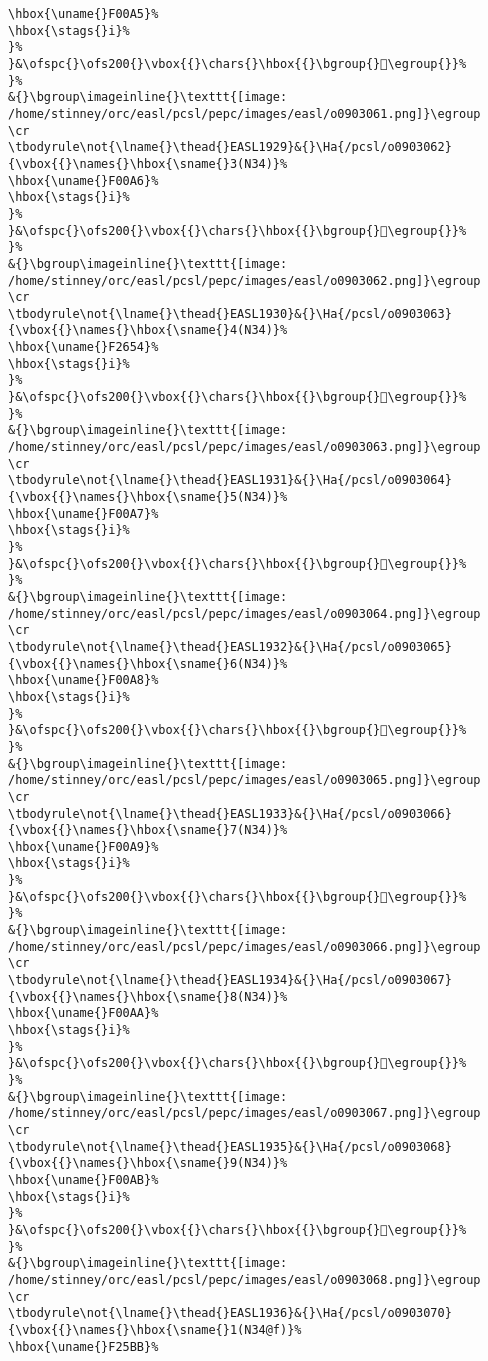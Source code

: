 \begin{verbatim}
\hbox{\uname{}F00A5}%
\hbox{\stags{}i}%
}%
}&\ofspc{}\ofs200{}\vbox{{}\chars{}\hbox{{}\bgroup{}󰂥\egroup{}}%
}%
&{}\bgroup\imageinline{}\texttt{[image: /home/stinney/orc/easl/pcsl/pepc/images/easl/o0903061.png]}\egroup
\cr
\tbodyrule\not{\lname{}\thead{}EASL1929}&{}\Ha{/pcsl/o0903062}{\vbox{{}\names{}\hbox{\sname{}3(N34)}%
\hbox{\uname{}F00A6}%
\hbox{\stags{}i}%
}%
}&\ofspc{}\ofs200{}\vbox{{}\chars{}\hbox{{}\bgroup{}󰂦\egroup{}}%
}%
&{}\bgroup\imageinline{}\texttt{[image: /home/stinney/orc/easl/pcsl/pepc/images/easl/o0903062.png]}\egroup
\cr
\tbodyrule\not{\lname{}\thead{}EASL1930}&{}\Ha{/pcsl/o0903063}{\vbox{{}\names{}\hbox{\sname{}4(N34)}%
\hbox{\uname{}F2654}%
\hbox{\stags{}i}%
}%
}&\ofspc{}\ofs200{}\vbox{{}\chars{}\hbox{{}\bgroup{}󲙔\egroup{}}%
}%
&{}\bgroup\imageinline{}\texttt{[image: /home/stinney/orc/easl/pcsl/pepc/images/easl/o0903063.png]}\egroup
\cr
\tbodyrule\not{\lname{}\thead{}EASL1931}&{}\Ha{/pcsl/o0903064}{\vbox{{}\names{}\hbox{\sname{}5(N34)}%
\hbox{\uname{}F00A7}%
\hbox{\stags{}i}%
}%
}&\ofspc{}\ofs200{}\vbox{{}\chars{}\hbox{{}\bgroup{}󰂧\egroup{}}%
}%
&{}\bgroup\imageinline{}\texttt{[image: /home/stinney/orc/easl/pcsl/pepc/images/easl/o0903064.png]}\egroup
\cr
\tbodyrule\not{\lname{}\thead{}EASL1932}&{}\Ha{/pcsl/o0903065}{\vbox{{}\names{}\hbox{\sname{}6(N34)}%
\hbox{\uname{}F00A8}%
\hbox{\stags{}i}%
}%
}&\ofspc{}\ofs200{}\vbox{{}\chars{}\hbox{{}\bgroup{}󰂨\egroup{}}%
}%
&{}\bgroup\imageinline{}\texttt{[image: /home/stinney/orc/easl/pcsl/pepc/images/easl/o0903065.png]}\egroup
\cr
\tbodyrule\not{\lname{}\thead{}EASL1933}&{}\Ha{/pcsl/o0903066}{\vbox{{}\names{}\hbox{\sname{}7(N34)}%
\hbox{\uname{}F00A9}%
\hbox{\stags{}i}%
}%
}&\ofspc{}\ofs200{}\vbox{{}\chars{}\hbox{{}\bgroup{}󰂩\egroup{}}%
}%
&{}\bgroup\imageinline{}\texttt{[image: /home/stinney/orc/easl/pcsl/pepc/images/easl/o0903066.png]}\egroup
\cr
\tbodyrule\not{\lname{}\thead{}EASL1934}&{}\Ha{/pcsl/o0903067}{\vbox{{}\names{}\hbox{\sname{}8(N34)}%
\hbox{\uname{}F00AA}%
\hbox{\stags{}i}%
}%
}&\ofspc{}\ofs200{}\vbox{{}\chars{}\hbox{{}\bgroup{}󰂪\egroup{}}%
}%
&{}\bgroup\imageinline{}\texttt{[image: /home/stinney/orc/easl/pcsl/pepc/images/easl/o0903067.png]}\egroup
\cr
\tbodyrule\not{\lname{}\thead{}EASL1935}&{}\Ha{/pcsl/o0903068}{\vbox{{}\names{}\hbox{\sname{}9(N34)}%
\hbox{\uname{}F00AB}%
\hbox{\stags{}i}%
}%
}&\ofspc{}\ofs200{}\vbox{{}\chars{}\hbox{{}\bgroup{}󰂫\egroup{}}%
}%
&{}\bgroup\imageinline{}\texttt{[image: /home/stinney/orc/easl/pcsl/pepc/images/easl/o0903068.png]}\egroup
\cr
\tbodyrule\not{\lname{}\thead{}EASL1936}&{}\Ha{/pcsl/o0903070}{\vbox{{}\names{}\hbox{\sname{}1(N34@f)}%
\hbox{\uname{}F25BB}%

\end{verbatim}
